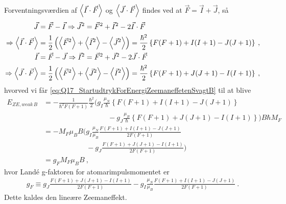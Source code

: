 Forventningsværdien af $\Braket{\Vec{I} \cdot \Vec{F}}$ og $\Braket{\Vec{J} \cdot \Vec{F}}$ findes ved at $\Vec{F} = \Vec{I} + \Vec{J}$, så
\begin{align}
    \Vec{J} &= \Vec{F} - \Vec{I} \Rightarrow \Vec{J}^2 = \Vec{F}^2 + \Vec{I}^2 - 2\Vec{I} \cdot \Vec{F} \nonumber\\
    \Rightarrow \Braket{\Vec{I} \cdot \Vec{F}} &= \frac{1}{2} \left(\Braket{\Vec{F}^2} + \Braket{\Vec{I}^2} - \Braket{\Vec{J}^2}\right) = \frac{\hbar^2}{2} \left\{F(F+1) + I(I+1) - J(J+1)\right\} \: , \\
    \Vec{I} &= \Vec{F} - \Vec{J} \Rightarrow \Vec{I}^2 = \Vec{F}^2 + \Vec{J}^2 - 2\Vec{J} \cdot \Vec{F} \nonumber\\
    \Rightarrow \Braket{\Vec{J} \cdot \Vec{F}} &= \frac{1}{2} \left(\Braket{\Vec{F}^2} + \Braket{\Vec{J}^2} - \Braket{\Vec{I}^2}\right) = \frac{\hbar^2}{2} \left\{F(F+1) + J(J+1) - I(I+1)\right\} \: ,
\end{align}
hvorved vi får \cref{eq:Q17_StartudtrykForEnergiZeemaneffetenSvagtB} til at blive
\begin{align} \label{eq:Q17_EnergiZeemanSvagtBfelt}
    E_{ZE,weak\,B} &= - \frac{1}{\hbar^2 F(F+1)} \frac{\hbar^2}{2}\bigg(g_I \frac{\mu_N}{\hbar} \left\{F(F+1) + I(I+1) - J(J+1)\right\} \nonumber\\
    &\qquad \qquad \qquad \qquad \quad - g_J \frac{\mu_B}{\hbar} \left\{F(F+1) + J(J+1) - I(I+1)\right\}\bigg) B \hbar M_F \nonumber\\
    &= - M_F \mu_B B \bigg(g_I \frac{\mu_N}{\mu_B} \frac{F(F+1) + I(I+1) - J(J+1)}{2F(F+1)} \nonumber\\
    &\qquad \qquad \qquad - g_J \frac{F(F+1) + J(J+1) - I(I+1)}{2F(F+1)}\bigg) \nonumber\\
    &= g_F M_F \mu_B B \: ,
\end{align}
hvor Landé g-faktoren for atomarimpulsmomentet er
\begin{align} \label{eq:Q17_gF}
    g_F \equiv g_J \frac{F(F+1) + J(J+1) - I(I+1)}{2F(F+1)} - g_I \frac{\mu_N}{\mu_B} \frac{F(F+1) + I(I+1) - J(J+1)}{2F(F+1)} \: .
\end{align}
Dette kaldes den \textsf{lineære Zeemaneffekt}.\\

